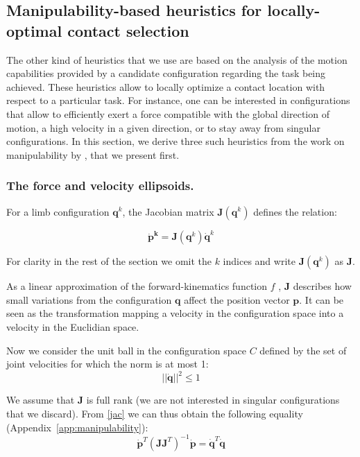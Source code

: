 \subsection{Manipulability-based heuristics for locally-optimal contact selection}
The other kind of heuristics that we use are based on the analysis of the motion capabilities
provided by a candidate configuration regarding the task being achieved.
These heuristics allow to locally optimize a contact location with respect to a particular task.
For instance, one can be interested in configurations that allow to efficiently exert a force compatible with the global direction of motion,
a high velocity in a given direction, or to stay away from singular configurations.
In this section, we derive three such heuristics from the work on manipulability by \cite{Yoshikawa1984}, that we present first.

\subsubsection{The force and velocity ellipsoids.}
For a limb configuration $\mathbf{q}^k$, the Jacobian matrix
 $\mathbf{J}(\mathbf{q}^k)$   defines the relation:
 
\begin{equation} \label{jac}
\mathbf{\dot{p}^k} = \mathbf{J}(\mathbf{q}^k) \dot{\mathbf{q}}^k
\end{equation}

For clarity in the rest of the section we omit the $k$ indices and write $\mathbf{J}(\mathbf{q}^k)$ as $\mathbf{J}$.
 
As a linear approximation of the forward-kinematics function $f$ , $\mathbf{J}$ describes how small
variations from the configuration $\mathbf{q}$ affect the position vector $\mathbf{p}$.
It can be seen as the transformation mapping a velocity in the configuration space into a velocity in
the Euclidian space.

Now we consider the unit ball in the configuration space $C$ defined by the set of joint velocities
for which the norm is at most 1:
\begin{equation} \label{ball}
||\dot{\mathbf{q}}||^2 \leq 1
\end{equation}

We assume that $\mathbf{J}$ is full rank (we are not interested in singular configurations that we discard).
From \eqref{jac} we can thus obtain the following equality (Appendix~\ref{app:manipulability}):
\begin{equation} \label{jaceq}
\mathbf{\dot{p}}^T(\mathbf{J}\mathbf{J}^T)^{-1}\mathbf{\dot{p}} = \dot{\mathbf{q}}^T \dot{\mathbf{q}}
\end{equation}

